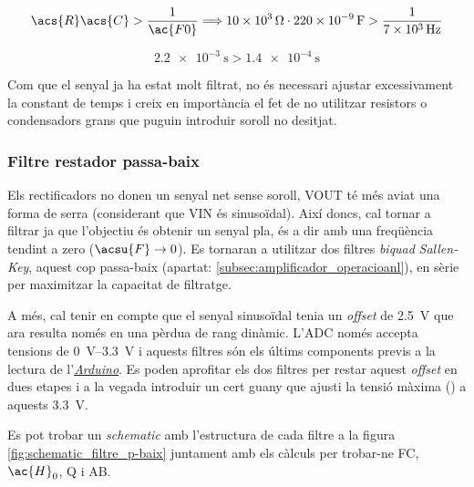 \begin{equation}\label{eq:rc1}
\acs{R}\acs{C} > \frac{\num{1}}{\ac{F0}} \Longrightarrow  \SI{10e3}{\ohm}\cdot\SI{220e-9}{\farad} > \frac{\num{1}}{\SI{7e3}{\hertz}}
\end{equation}

\begin{equation}\label{eq:rc2}
\SI{2.2e-3}{\second} > \SI{1.4e-4}{\second}
\end{equation}

Com que el senyal ja ha estat molt filtrat, no és necessari ajustar excessivament la constant de temps i creix en importància el fet de no utilitzar resistors o condensadors grans que puguin introduir soroll no desitjat.

\subsubsection{Filtre restador passa-baix}

Els rectificadors no donen un senyal net sense soroll, \ac{VOUT} té més aviat una forma de serra (considerant que \ac{VIN} és sinusoïdal). Així doncs, cal tornar a filtrar ja que l'objectiu és obtenir un senyal pla, és a dir amb una freqüència tendint a zero ($ \acsu{F} \rightarrow \num{0} $). Es tornaran a utilitzar dos filtres \textit{biquad} \textit{Sallen-Key}, aquest cop passa-baix (apartat: \ref{subsec:amplificador_operacioanl}), en sèrie per maximitzar la capacitat de filtratge.

A més, cal tenir en compte que el senyal sinusoïdal tenia un \textit{offset} de \SI{2.5}{\volt} que ara resulta només en una pèrdua de rang dinàmic. L'\ac{ADC} només accepta tensions de \SIrange[range-phrase = \ a\ ]{0}{3.3}{\volt} i aquests filtres són els últims components previs a la lectura de l'\hyperref[subsec:arduino]{\textit{Arduino}}. Es poden aprofitar els dos filtres per restar aquest \textit{offset} en dues etapes i a la vegada introduir un cert guany que ajusti la tensió màxima () a aquests \SI{3.3}{\volt}.

Es pot trobar un \textit{schematic} amb l'estructura de cada filtre a la figura \ref{fig:schematic_filtre_p-baix} juntament amb els càlculs per trobar-ne \ac{FC}, $ \ac{H}_0 $, \ac{Q} i \ac{AB}.

